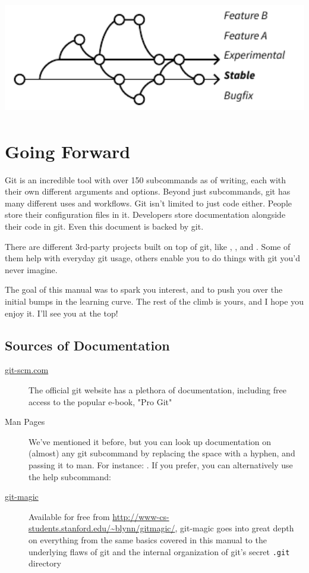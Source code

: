 \documentclass[11pt,letterpaper,twoside]{report}
\begin{document}
\vspace{\fill}
\begin{center}
\includegraphics[height=5cm]{resources/example_branching.pdf}
\end{center}
\vspace*{\fill}

\chapter{Going Forward}

Git is an incredible tool with over 150 subcommands as of writing, each with
their own different arguments and options. Beyond just subcommands, git has many
different uses and workflows. Git isn't limited to just code either. People
store their configuration files in it. Developers store documentation alongside
their code in git. Even this document is backed by git.

There are different 3rd-party projects built on top of git, like
, , and . Some of them help
with everyday git usage, others enable you to do things with git you'd never
imagine.

The goal of this manual was to spark you interest, and to push you over the
initial bumps in the learning curve. The rest of the climb is yours, and I hope
you enjoy it. I'll see you at the top!

\section{Sources of Documentation}

\begin{description}
\item[\href{http://git-scm.com/documentation}{git-scm.com}]
    The official git website has a plethora of documentation, including free
    access to the popular e-book, "Pro Git"
\item[Man Pages]
    We've mentioned it before, but you can look up documentation on (almost) any
    git subcommand by replacing the space with a hyphen, and passing it to man.
    For instance: . If you prefer, you can alternatively use
    the help subcommand: 
\item[\href{http://www-cs-students.stanford.edu/~blynn/gitmagic/}{git-magic}]
    Available for free from
    \url{http://www-cs-students.stanford.edu/~blynn/gitmagic/}, git-magic goes
    into great depth on everything from the same basics covered in this manual
    to the underlying flaws of git and the internal organization of git's secret
    \texttt{.git} directory
\end{description}
\end{document}
